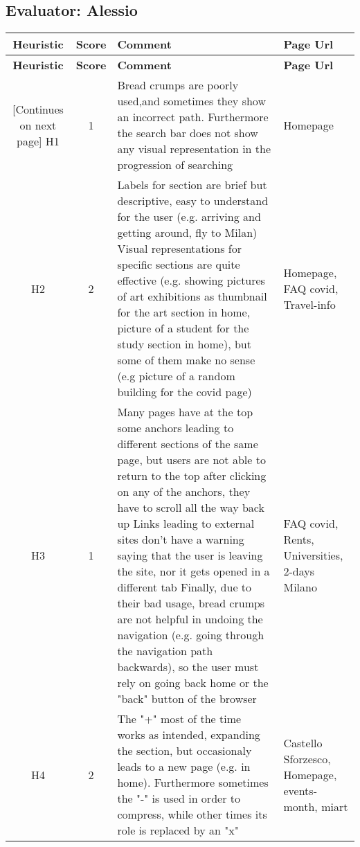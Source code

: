 \begin{small}
\subsection{Evaluator: Alessio}
\begin{tabularx}{\linewidth}{c c X p{3cm}}
    \textbf{Heuristic} & \textbf{Score} & \textbf{Comment} & \textbf{Page Url}
    \\ \midrule
    \endfirsthead
    \toprule
    \textbf{Heuristic} & \textbf{Score} & \textbf{Comment} & \textbf{Page Url}
    \\ \midrule
    \endhead
    \midrule
    \footnotesize [Continues on next page]
    \endfoot
    \bottomrule
    \endlastfoot
    H1 & 1 & Bread crumps are poorly used,and sometimes they show an incorrect path. Furthermore the search bar does not show any visual representation in the progression of searching & Homepage\\ \midrule
    H2 & 2 & Labels for section are brief but
    descriptive, easy to understand
    for the user (e.g. arriving and
    getting around, fly to Milan)
    Visual representations for specific
    sections are quite effective (e.g.
    showing pictures of art exhibitions
    as thumbnail for the art section in
    home, picture of a student for
    the study section in home), but
    some of them make no sense
    (e.g picture of a random
    building for the covid page) & Homepage, FAQ covid, Travel-info \\ \midrule
    H3 & 1 & Many pages have at the top
    some anchors leading to different
    sections of the same page,
    but users are not able to return to
    the top after clicking on any of the
    anchors, they have to scroll
    all the way back up
    Links leading to external sites
    don't have a warning saying that the
    user is leaving the site, nor it gets
    opened in a different tab
    Finally, due to their bad usage, bread
    crumps are not helpful in undoing the
    navigation (e.g. going through the
    navigation path backwards), so the user
    must rely on going back home or the
    "back" button of the browser & FAQ covid, Rents, Universities, 2-days Milano\\ \midrule
    H4 & 2 & The "+" most of the time works as intended,
    expanding the section, but
    occasionaly leads to a new page
    (e.g. in home). Furthermore sometimes
    the "-" is used in order to compress,
    while other times its role is replaced by
    an "x" & Castello Sforzesco, Homepage, events-month, miart\\ \midrule

\end{tabularx}
\end{small}
